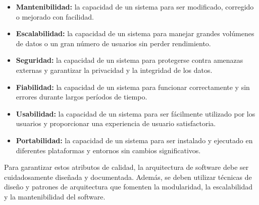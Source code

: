 \documentclass[executivepaper]{article}
\begin{document}
\begin{itemize}
\item \textbf{Mantenibilidad:} la capacidad de un sistema para ser modificado, corregido o mejorado con facilidad.
\item \textbf{Escalabilidad:} la capacidad de un sistema para manejar grandes volúmenes de datos o un gran número de usuarios sin perder rendimiento.
\item \textbf{Seguridad:} la capacidad de un sistema para protegerse contra amenazas externas y garantizar la privacidad y la integridad de los datos.
\item \textbf{Fiabilidad:} la capacidad de un sistema para funcionar correctamente y sin errores durante largos períodos de tiempo.
\item \textbf{Usabilidad:} la capacidad de un sistema para ser fácilmente utilizado por los usuarios y proporcionar una experiencia de usuario satisfactoria.
\item \textbf{Portabilidad:} la capacidad de un sistema para ser instalado y ejecutado en diferentes plataformas y entornos sin cambios significativos.
\end{itemize}

Para garantizar estos atributos de calidad, la arquitectura de software debe ser cuidadosamente diseñada y documentada. Además, se deben utilizar técnicas de diseño y patrones de arquitectura que fomenten la modularidad, la escalabilidad y la mantenibilidad del software.
\end{document}
